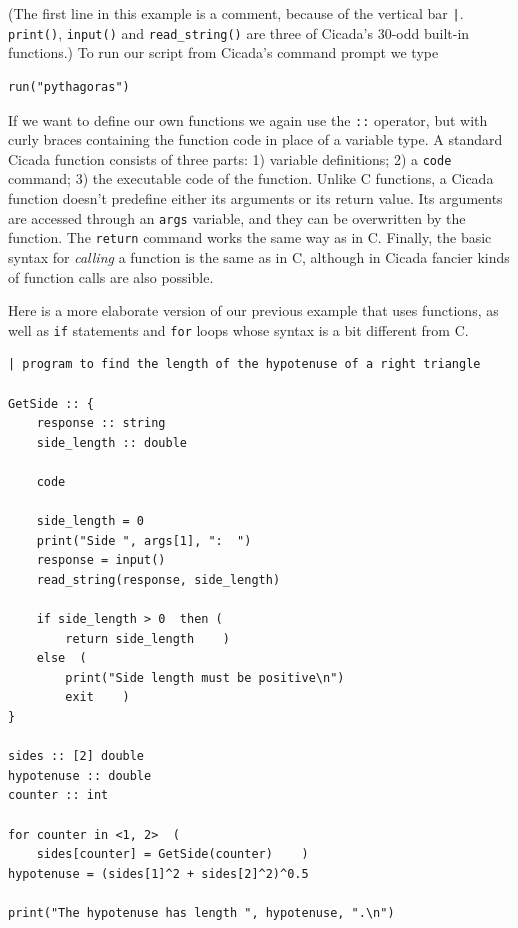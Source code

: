 \documentclass{article}
\newenvironment{code}{
       \begin{list}{}{
               \setlength{\leftmargin}{.4in}
               \setlength{\rightmargin}{0in}
               \setlength{\topsep}{.2in}
       }
       \small
       \item[] }
       { \end{list}   }
\begin{document}
\noindent (The first line in this example is a comment, because of the vertical bar \verb#|#.  \verb#print()#, \verb#input()# and \verb#read_string()# are three of Cicada's 30-odd built-in functions.)  To run our script from Cicada's command prompt we type

\begin{code} \begin{verbatim}
run("pythagoras")
\end{verbatim} \end{code}

If we want to define our own functions we again use the \verb#::# operator, but with curly braces containing the function code in place of a variable type.  A standard Cicada function consists of three parts:  1) variable definitions; 2) a \verb#code# command; 3) the executable code of the function.  Unlike C functions, a Cicada function doesn't predefine either its arguments or its return value.  Its arguments are accessed through an \verb#args# variable, and they can be overwritten by the function.  The \verb#return# command works the same way as in C.  Finally, the basic syntax for \emph{calling} a function is the same as in C, although in Cicada fancier kinds of function calls are also possible.

Here is a more elaborate version of our previous example that uses functions, as well as \verb#if# statements and \verb#for# loops whose syntax is a bit different from C.

\begin{code} \begin{verbatim}
| program to find the length of the hypotenuse of a right triangle

GetSide :: {
    response :: string
    side_length :: double
    
    code
    
    side_length = 0
    print("Side ", args[1], ":  ")
    response = input()
    read_string(response, side_length)
    
    if side_length > 0  then (
        return side_length    )
    else  (
        print("Side length must be positive\n")
        exit    )
}

sides :: [2] double
hypotenuse :: double
counter :: int

for counter in <1, 2>  (
    sides[counter] = GetSide(counter)    )
hypotenuse = (sides[1]^2 + sides[2]^2)^0.5

print("The hypotenuse has length ", hypotenuse, ".\n")
\end{verbatim} \end{code}
\end{document}
